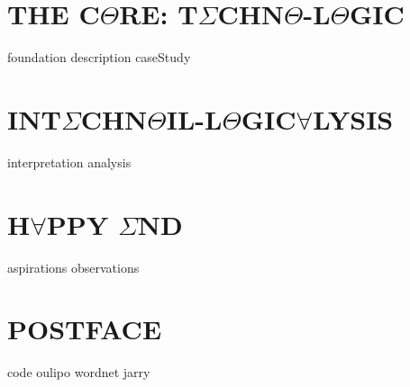 \documentclass[oneside]{thesis}
\begin{document}
\part{\texorpdfstring{THE C$\Theta$RE: T$\Sigma$CHN$\Theta$-L$\Theta$GIC}{THE CORE: TECHNO-LOGIC}}
{foundation}
{description}
{caseStudy}

\part{\texorpdfstring{INT$\Sigma$CHN$\Theta$IL-L$\Theta$GIC$\forall$LYSIS}{INTECHNOIL-LOGICALYSIS}}
{interpretation}
{analysis}

\part{\texorpdfstring{H$\forall$PPY $\Sigma$ND}{SO LONG, AND THANKS FOR ALL THE FISH}}
{aspirations}
{observations}

\appendix

\part*{\texorpdfstring{POSTFACE}{POSTFACE}}
{code}
{oulipo}
{wordnet}
{jarry}
\clearpage

\pagestyle{plain}
{}
\clearpage

{}
\printnoidxglossary
\clearpage
\end{document}
